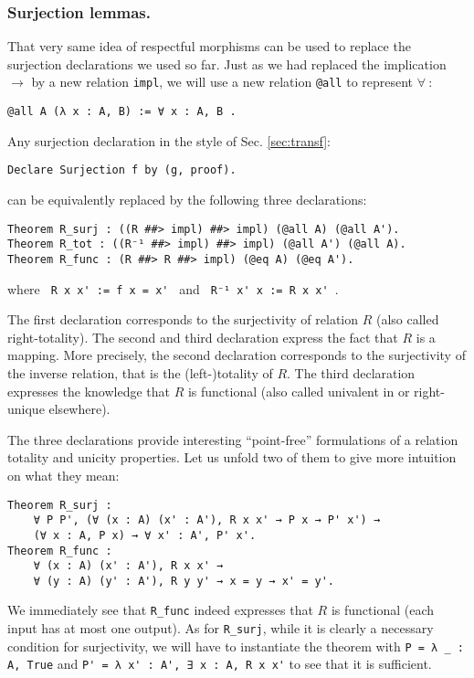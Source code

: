 \documentclass{llncs}
\begin{document}
\subsubsection{Surjection lemmas.}

That very same idea of respectful morphisms can be used to replace
the surjection declarations we used so far.
Just as we had replaced the implication $\rightarrow$ by a new relation
\texttt{impl}, we will use a new relation \texttt{@all} to represent $\forall~$:
\begin{verbatim}@all A (λ x : A, B) := ∀ x : A, B .\end{verbatim}

Any surjection declaration in the style of Sec. \ref{sec:transf}:
\begin{verbatim}Declare Surjection f by (g, proof).\end{verbatim}
can be equivalently replaced by the following three declarations:
\begin{verbatim}Theorem R_surj : ((R ##> impl) ##> impl) (@all A) (@all A').
Theorem R_tot : ((R⁻¹ ##> impl) ##> impl) (@all A') (@all A).
Theorem R_func : (R ##> R ##> impl) (@eq A) (@eq A').\end{verbatim}
where \verb| R x x' := f x = x' | and \verb| R⁻¹ x' x := R x x' |.

The first declaration corresponds to the surjectivity of relation $R$
(also called right-totality).
The second and third declaration express the fact that $R$ is a mapping.
More precisely, the second declaration corresponds to the surjectivity of the inverse
relation, that is the (left-)totality of $R$.
The third declaration expresses the knowledge that $R$ is functional
(also called univalent in \cite[Ch. 5.1]{schmidt2011relational} or right-unique
elsewhere).

The three declarations provide interesting ``point-free'' formulations
of a relation totality and unicity properties. Let us unfold two of
them to give more intuition on what they mean:

\begin{verbatim}
Theorem R_surj :
    ∀ P P', (∀ (x : A) (x' : A'), R x x' → P x → P' x') →
    (∀ x : A, P x) → ∀ x' : A', P' x'.
Theorem R_func :
    ∀ (x : A) (x' : A'), R x x' →
    ∀ (y : A) (y' : A'), R y y' → x = y → x' = y'.\end{verbatim}
We immediately see that \verb|R_func| indeed expresses that $R$ is
functional (each input has at most one output).
As for \verb|R_surj|, while it is clearly a necessary
condition for surjectivity,
we will have to instantiate the
theorem with \verb|P = λ _ : A, True| and \verb|P' = λ x' : A', ∃ x : A, R x x'|
to see that it is sufficient.
\end{document}
